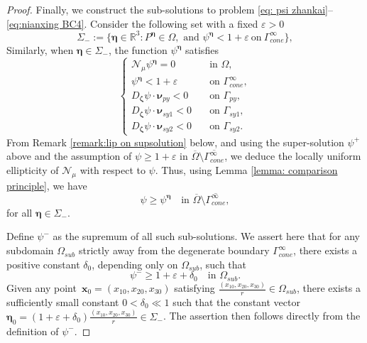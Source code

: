 \documentclass[10pt,a4paper]{amsart}
\begin{document}
\begin{proof}
   Finally, we construct the sub-solutions to problem \eqref{eq: psi zhankai}--\eqref{eq:nianxing BC4}. Consider the following set with a fixed $\varepsilon>0$
	\begin{equation}\label{eq: Sigma fu}
		\Sigma_{-}:=\{\bm{\eta}\in\mathbb{R}^{3}: P^{\bm{\eta}}\in \Omega,\text{ and }{\psi}^{\bm{\eta}}<1+\varepsilon~\text{on}~\Gamma_{cone}^{\infty}\},
	\end{equation}
  Similarly, when $\bm{\eta}\in {\Sigma}_{-}$, the function ${\psi}^{\bm{\eta}}$ satisfies
	\begin{equation*}
		\begin{cases}
			\mathcal{N}_\mu {\psi}^{\bm{\eta}}= 0\quad&\text{in $\Omega$},\\
			{\psi}^{\bm{\eta}}<1+\varepsilon\quad&\text{on $\Gamma_{cone}^{\infty}$},\\
            D_{\bm{\zeta}}\psi\cdot\bm{\nu}_{py}<0\quad&\text{on $\Gamma_{py}$},\\
			D_{\bm{\zeta}}\psi\cdot\bm{\nu}_{sy1}<0\quad&\text{on $\Gamma_{sy1}$},\\
                D_{\bm{\zeta}}\psi\cdot\bm{\nu}_{sy2}<0\quad&\text{on $\Gamma_{sy2}$}.
		\end{cases}
	\end{equation*}
  From Remark \ref{remark:lip on supsolution} below, and using the super-solution $\psi^+$ above and the assumption of $\psi\geq 1+\varepsilon$ in $\overline{\Omega}\setminus\overline{\Gamma_{cone}^{\infty}}$, we deduce the locally uniform ellipticity of $\mathcal{N}_\mu$ with respect to $\psi$. Thus, using Lemma \ref{lemma: comparison principle}, we have
	\begin{equation}\label{eq1:11}
		{\psi}\geq {\psi}^{\bm{\eta}}\quad\text{in $\overline{\Omega}\setminus\overline{\Gamma_{cone}^{\infty}}$},
	\end{equation}
  for all $\bm{\eta}\in {\Sigma}_{-}$.  
   
    Define $\psi^-$ as the supremum of all such sub-solutions. We assert here that for any subdomain $\Omega_{sub}$ strictly away from the degenerate boundary $\Gamma_{cone}^{\infty}$, there exists a positive constant $\delta_0$, depending only on $\Omega_{sub}$, such that
	\begin{equation}\label{eq1:3.21}
		{\psi}^{-}\geq 1+\varepsilon+\delta_0\quad\text{in $\Omega_{sub}$}.
	\end{equation}
   Given any point~$\bm{x}_{0}=(x_{10},x_{20},x_{30})$ satisfying $\frac{(x_{10},x_{20},x_{30})}{r}\in \Omega_{sub}$, there exists a sufficiently small constant $0<\delta_0\ll 1$ such that the constant vector $\bm{\eta}_{0}=(1+\varepsilon+\delta_0)\frac{(x_{10},x_{20},x_{30})}{r}\in\Sigma_{-}$. The assertion then follows directly from the definition of $\psi^-$.
 

\end{proof}
\end{document}

